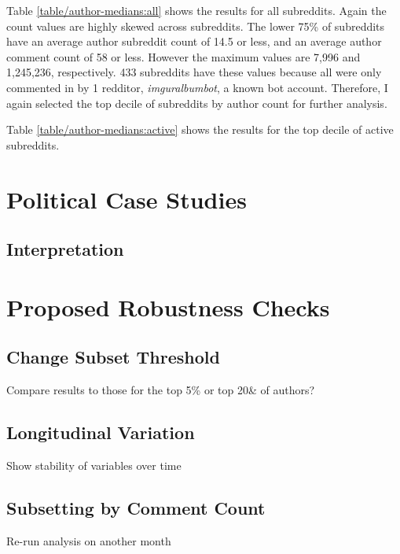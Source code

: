 \documentclass{article}
\begin{document}
Table \ref{table/author-medians:all} shows the results for all subreddits. Again the count values are highly skewed across subreddits. The lower 75\% of subreddits have an average author subreddit count of 14.5 or less, and an average author comment count of 58 or less. However the maximum values are 7,996 and 1,245,236, respectively. 433 subreddits have these values because all were only commented in by 1 redditor, \textit{imguralbumbot}, a known bot account. Therefore, I again selected the top decile of subreddits by author count for further analysis.

Table \ref{table/author-medians:active} shows the results for the top decile of active subreddits. 






\section{Political Case Studies}


\subsection{Interpretation}

















\section{Proposed Robustness Checks}

\subsection{Change Subset Threshold}

Compare results to those for the top 5\% or top 20\& of authors?

\subsection{Longitudinal Variation}

Show stability of variables over time

\subsection{Subsetting by Comment Count}

Re-run analysis on another month
\end{document}
